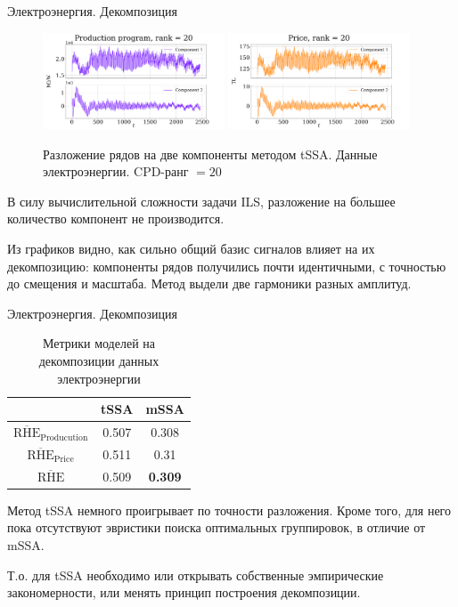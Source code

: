	\begin{frame}{Электроэнергия. Декомпозиция}
		
		\begin{figure}[h]
			\centering
			\includegraphics[width=0.48\textwidth, keepaspectratio]{../../experiments/electricity/tssa/figs/decomposition/cpd_rank_20/Production program.png}
			\includegraphics[width=0.48\textwidth, keepaspectratio]{../../experiments/electricity/tssa/figs/decomposition/cpd_rank_20/Price.png}
			\caption{Разложение рядов на две компоненты методом tSSA. Данные электроэнергии. CPD-ранг $ = 20 $}
		\end{figure} 
		
		В силу вычислительной сложности задачи ILS, разложение на б$\acute{\text{о}}$льшее количество компонент не производится. 
		
		Из графиков видно, как сильно общий базис сигналов влияет на их декомпозицию: компоненты рядов получились почти идентичными, с точностью до смещения и масштаба. Метод выдели две гармоники разных амплитуд.
		
	\end{frame}
	
	\begin{frame}{Электроэнергия. Декомпозиция}
		
		\def\arraystretch{1.1}
		\begin{table}[h]
			\centering
			\caption{Метрики моделей на декомпозиции данных электроэнергии}
			\begin{tabular}{|c|c|c|}
				\hline
				& tSSA  & mSSA           \\ \hline
				$ \overline{\text{RHE}}_{\text{Producution}} $  & 0.507 & 0.308          \\ \hline
				$ \overline{\text{RHE}}_{\text{Price}} $      & 0.511 & 0.31           \\ \hline
				$ \overline{\text{RHE}} $             & 0.509 & \textbf{0.309} \\ \hline
			\end{tabular}
		\end{table}
		
		Метод tSSA немного проигрывает по точности разложения. Кроме того, для него пока отсутствуют эвристики поиска оптимальных группировок, в отличие от mSSA. 
		
		Т.о. для tSSA необходимо или открывать собственные эмпирические закономерности, или менять принцип построения декомпозиции.
		
	\end{frame}
	
